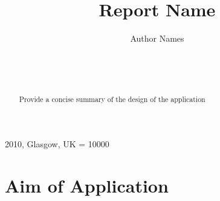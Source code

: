 \documentclass{sig-alt-release2}
\begin{document}
\newcommand{\todo}[1]{\textcolor{red}{#1}}
\def\newblock{\hskip .11em plus .33em minus .07em}

 {2010, Glasgow, UK} 
\widowpenalty = 10000

\title{{Report Name}}

\author{
\alignauthor
Author Names\\
	   \\
      \\
      \\
}
\maketitle

\begin{abstract}
Provide a concise summary of the design of the application

\end{abstract}

\section{Aim of Application}

\end{document}
